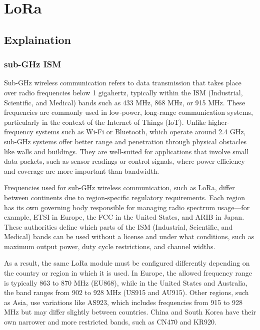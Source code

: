 \chapter{LoRa}
\section{Explaination}

\subsection{sub-GHz ISM}

Sub-GHz wireless communication refers to data transmission that takes place over radio frequencies below 1 gigahertz, typically within the ISM (Industrial, Scientific, and Medical) bands such as 433 MHz, 868 MHz, or 915 MHz. These frequencies are commonly used in low-power, long-range communication systems, particularly in the context of the Internet of Things (IoT). Unlike higher-frequency systems such as Wi-Fi or Bluetooth, which operate around 2.4 GHz, sub-GHz systems offer better range and penetration through physical obstacles like walls and buildings. They are well-suited for applications that involve small data packets, such as sensor readings or control signals, where power efficiency and coverage are more important than bandwidth.

Frequencies used for sub-GHz wireless communication, such as LoRa, differ between continents due to region-specific regulatory requirements. Each region has its own governing body responsible for managing radio spectrum usage—for example, ETSI in Europe, the FCC in the United States, and ARIB in Japan. These authorities define which parts of the ISM (Industrial, Scientific, and Medical) bands can be used without a license and under what conditions, such as maximum output power, duty cycle restrictions, and channel widths.

As a result, the same LoRa module must be configured differently depending on the country or region in which it is used. In Europe, the allowed frequency range is typically 863 to 870 MHz (EU868), while in the United States and Australia, the band ranges from 902 to 928 MHz (US915 and AU915). Other regions, such as Asia, use variations like AS923, which includes frequencies from 915 to 928 MHz but may differ slightly between countries. China and South Korea have their own narrower and more restricted bands, such as CN470 and KR920.

